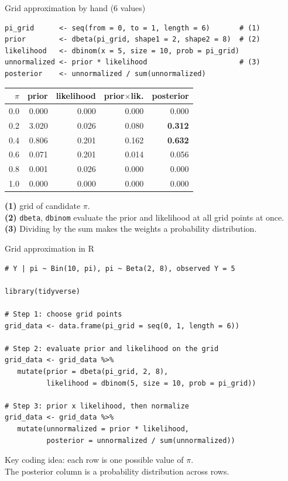 \documentclass[aspectratio=43,11pt]{beamer}
\begin{document}
\begin{frame}[fragile]{Grid approximation by hand (6 values)}
\begin{lstlisting}
pi_grid      <- seq(from = 0, to = 1, length = 6)       # (1)
prior        <- dbeta(pi_grid, shape1 = 2, shape2 = 8)  # (2)
likelihood   <- dbinom(x = 5, size = 10, prob = pi_grid)
unnormalized <- prior * likelihood                      # (3)
posterior    <- unnormalized / sum(unnormalized)
\end{lstlisting}
  \vspace{-2pt}
  \begin{center}
  \footnotesize
  \begin{tabular}{rrrrr}
    \toprule
    $\pi$ & prior & likelihood & prior$\times$lik. & posterior\\
    \midrule
    0.0 & 0.000 & 0.000 & 0.000 & 0.000\\
    0.2 & 3.020 & 0.026 & 0.080 & \textbf{0.312}\\
    0.4 & 0.806 & 0.201 & 0.162 & \textbf{0.632}\\
    0.6 & 0.071 & 0.201 & 0.014 & 0.056\\
    0.8 & 0.001 & 0.026 & 0.000 & 0.000\\
    1.0 & 0.000 & 0.000 & 0.000 & 0.000\\
    \bottomrule
  \end{tabular}
  \end{center}
  \footnotesize
  \textbf{(1)} grid of candidate $\pi$.\\
  \textbf{(2)} \texttt{dbeta}, \texttt{dbinom} evaluate the
  prior and likelihood at all grid points at once.\\
  \textbf{(3)} Dividing by the sum makes
  the weights a probability distribution.
\end{frame}

\begin{frame}[fragile]{Grid approximation in R}
\begin{lstlisting}
# Y | pi ~ Bin(10, pi), pi ~ Beta(2, 8), observed Y = 5

library(tidyverse)

# Step 1: choose grid points
grid_data <- data.frame(pi_grid = seq(0, 1, length = 6))

# Step 2: evaluate prior and likelihood on the grid
grid_data <- grid_data %>%
   mutate(prior = dbeta(pi_grid, 2, 8),
          likelihood = dbinom(5, size = 10, prob = pi_grid))

# Step 3: prior x likelihood, then normalize
grid_data <- grid_data %>%
   mutate(unnormalized = prior * likelihood,
          posterior = unnormalized / sum(unnormalized))
\end{lstlisting}
\small{Key coding idea: each row is one possible value of $\pi$.\\
The posterior column is a probability distribution across rows.}
\end{frame}
\end{document}
